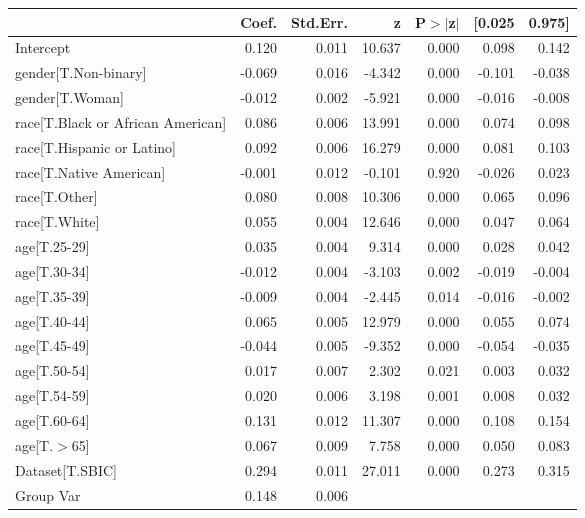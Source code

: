 \begin{table}
\begin{center}
\begin{tabular}{lrrrrrr}
\hline
                                  &  Coef. & Std.Err. &      z & P$> |$z$|$ & [0.025 & 0.975]  \\
\hline
Intercept                         &  0.120 &    0.011 & 10.637 &       0.000 &  0.098 &  0.142  \\
gender[T.Non-binary]              & -0.069 &    0.016 & -4.342 &       0.000 & -0.101 & -0.038  \\
gender[T.Woman]                   & -0.012 &    0.002 & -5.921 &       0.000 & -0.016 & -0.008  \\
race[T.Black or African American] &  0.086 &    0.006 & 13.991 &       0.000 &  0.074 &  0.098  \\
race[T.Hispanic or Latino]        &  0.092 &    0.006 & 16.279 &       0.000 &  0.081 &  0.103  \\
race[T.Native American]           & -0.001 &    0.012 & -0.101 &       0.920 & -0.026 &  0.023  \\
race[T.Other]                     &  0.080 &    0.008 & 10.306 &       0.000 &  0.065 &  0.096  \\
race[T.White]                     &  0.055 &    0.004 & 12.646 &       0.000 &  0.047 &  0.064  \\
age[T.25-29]                      &  0.035 &    0.004 &  9.314 &       0.000 &  0.028 &  0.042  \\
age[T.30-34]                      & -0.012 &    0.004 & -3.103 &       0.002 & -0.019 & -0.004  \\
age[T.35-39]                      & -0.009 &    0.004 & -2.445 &       0.014 & -0.016 & -0.002  \\
age[T.40-44]                      &  0.065 &    0.005 & 12.979 &       0.000 &  0.055 &  0.074  \\
age[T.45-49]                      & -0.044 &    0.005 & -9.352 &       0.000 & -0.054 & -0.035  \\
age[T.50-54]                      &  0.017 &    0.007 &  2.302 &       0.021 &  0.003 &  0.032  \\
age[T.54-59]                      &  0.020 &    0.006 &  3.198 &       0.001 &  0.008 &  0.032  \\
age[T.60-64]                      &  0.131 &    0.012 & 11.307 &       0.000 &  0.108 &  0.154  \\
age[T.$>$65]                      &  0.067 &    0.009 &  7.758 &       0.000 &  0.050 &  0.083  \\
Dataset[T.SBIC]                   &  0.294 &    0.011 & 27.011 &       0.000 &  0.273 &  0.315  \\
Group Var                         &  0.148 &    0.006 &        &             &        &         \\
\hline
\end{tabular}
\end{center}
\end{table}
\bigskip